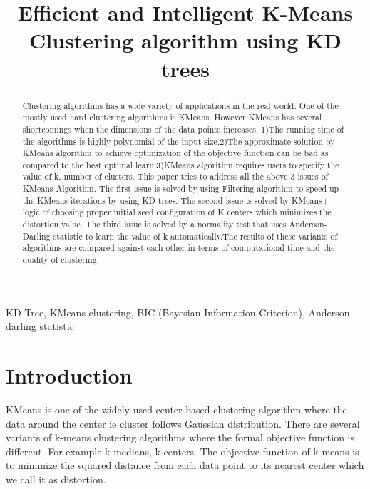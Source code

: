 \documentclass[conference]{IEEEtran}
\begin{document}
\title{Efficient and Intelligent K-Means Clustering algorithm using KD trees }




\author{
}


\maketitle


\begin{abstract}Clustering algorithms has a wide variety of applications in the real world. One of the mostly used hard clustering algorithms is KMeans. However KMeans has several shortcomings when the dimensions of the data points increases.
1)The running time of the algorithms is highly polynomial of the input size.2)The approximate solution by KMeans algorithm to achieve optimization of the objective function can be bad as compared to the best optimal learn.3)KMeans algorithm requires users to specify the value of k, number of clusters. This paper tries to address all the above 3 issues of KMeans Algorithm. The first issue is solved by using Filtering algorithm to speed up the KMeans iterations by using KD trees. The second issue is solved by KMeans++ logic of choosing proper initial seed configuration of K centers which minimizes the distortion value. The third issue is solved by a normality test that uses Anderson-Darling statistic to learn the value of k automatically.The results of these variants of algorithms are compared against each other in terms of computational time and the quality of clustering.



\end{abstract}
\hspace{2mm}
\begin{IEEEkeywords}
KD Tree, KMeans clustering, BIC (Bayesian Information Criterion), Anderson darling statistic
\end{IEEEkeywords}




\IEEEpeerreviewmaketitle



\section{Introduction}
KMeans is one of the widely used center-based clustering algorithm where the data around the center ie cluster follows Gaussian distribution. There are several variants of k-means clustering algorithms where the formal objective function is different. For example k-medians, k-centers. The objective function of k-means is to minimize the squared distance from each data point to its nearest center which we call it as distortion.
\end{document}
